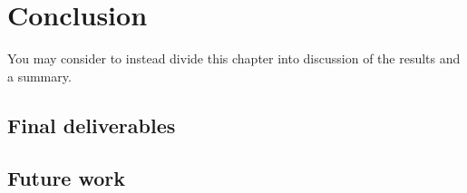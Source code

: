 \chapter{Conclusion}

You may consider to instead divide this chapter into discussion of the results and a summary. 

\section{Final deliverables}

\section{Future work}